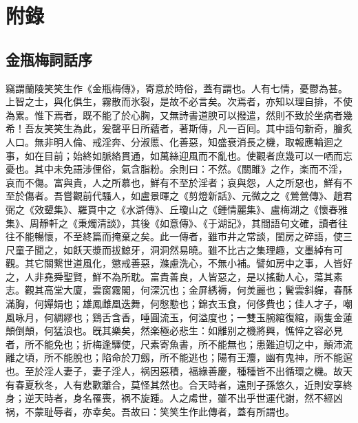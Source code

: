 \part*{附錄}

\chapter*{金瓶梅詞話序}


竊謂蘭陵笑笑生作《金瓶梅傳》，寄意於時俗，蓋有謂也。人有七情，憂鬱為甚。上智之士，與化俱生，霧散而氷裂，是故不必言矣。次焉者，亦知以理自排，不使為累。惟下焉者，既不能了於心胸，又無詩書道腴可以撥遣，然則不致於坐病者幾希！吾友笑笑生為此，爰罄平日所蘊者，著斯傳，凡一百囘。其中語句新奇，膾炙人口。無非明人倫、戒淫奔、分淑慝、化善惡，知盛衰消長之機，取報應輪迴之事，如在目前；始終如脈絡貫通，如萬絲迎風而不亂也。使觀者庶幾可以一哂而忘憂也。其中未免語涉俚俗，氣含脂粉。余則曰：不然。《關雎》之作，楽而不淫，哀而不傷。富與貴，人之所慕也，鮮有不至於淫者；哀與怨，人之所惡也，鮮有不至於傷者。吾嘗觀前代騷人，如盧景暉之《剪燈新話》、元微之之《鶯鶯傳》、趙君弼之《效顰集》、羅貫中之《水滸傳》、丘瓊山之《鍾情麗集》、盧梅湖之《懷春雅集》、周靜軒之《秉燭清談》，其後《如意傳》、《于湖記》，其間語句文確，讀者往往不能暢懷，不至終篇而掩棄之矣。此一傳者，雖市井之常談，閨房之碎語，使三尺童子聞之，如飫天漿而拔鯨牙，洞洞然易曉。雖不比古之集理趣，文墨綽有可觀。其它關繋世道風化，懲戒善惡，滌慮洗心，不無小補。譬如房中之事，人皆好之，人非堯舜聖賢，鮮不為所耽。富貴善良，人皆惡之，是以搖動人心，蕩其素志。觀其高堂大廈，雲窗霧閣，何深沉也；金屏綉褥，何羙麗也；鬢雲斜軃，春酥滿胸，何嬋娟也；雄鳳雌凰迭舞，何慇懃也；錦衣玉食，何侈費也；佳人才子，嘲風咏月，何綢繆也；鷄舌含香，唾圓流玉，何溢度也；一雙玉腕綰復綰，兩隻金蓮顛倒顛，何猛浪也。旣其樂矣，然楽極必悲生：如離别之機將興，憔悴之容必見者，所不能免也；折梅逢驛使，尺素寄魚書，所不能無也；患難迫切之中，顛沛流離之頃，所不能脫也；陷命於刀劔，所不能逃也；陽有王灋，幽有鬼神，所不能逭也。至於淫人妻子，妻子淫人，祸因惡積，福緣善慶，種種皆不出循環之機。故天有春夏秋冬，人有悲歡離合，莫怪其然也。合天時者，遠則子孫悠久，近則安享終身；逆天時者，身名罹喪，祸不旋踵。人之䖏世，雖不出乎世運代謝，然不經凶祸，不蒙耻辱者，亦幸矣。吾故曰：笑笑生作此傳者，蓋有所謂也。

\begin{quotation}
\end{quotation}

